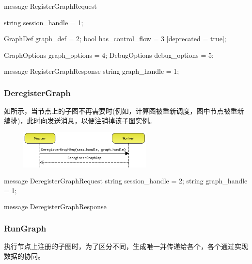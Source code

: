 \begin{content}
\begin{content}
\begin{content}
\begin{leftbar}
\begin{c++}
message RegisterGraphRequest {
  string session_handle = 1;

  GraphDef graph_def = 2;
  bool has_control_flow = 3 [deprecated = true];

  GraphOptions graph_options = 4;
  DebugOptions debug_options = 5;
}

message RegisterGraphResponse {
  string graph_handle = 1;
}
\end{c++}
\end{leftbar}


\subsubsection{DeregisterGraph}

如所示，当节点上的子图不再需要时(例如，计算图被重新调度，图中节点被重新编排)，此时向发送消息，以便注销掉该子图实例。

\begin{figure}[H]
\centering
\includegraphics[width=0.6\textwidth]{figures/dist-worker-deregister-graph.png}
\caption{}
 \label{fig:dist-worker-deregister-graph}
\end{figure}

\begin{leftbar}
\begin{c++}
message DeregisterGraphRequest {
  string session_handle = 2;
  string graph_handle = 1;
}

message DeregisterGraphResponse {
}
\end{c++}
\end{leftbar}

\subsubsection{RunGraph}

执行节点上注册的子图时，为了区分不同，生成唯一并传递给各个，各个通过实现数据的协同。


\end{content}
\end{content}
\end{content}
